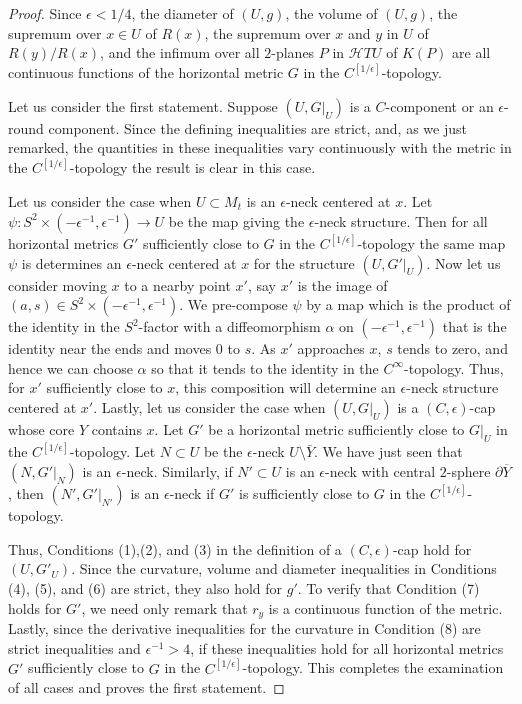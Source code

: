 \begin{proof}
Since $\epsilon<1/4$,  the diameter of $(U,g)$, the volume of
$(U,g)$, the supremum over $x\in U$ of $R(x)$, the supremum over $x$
and $y$ in $U$ of $R(y)/R(x)$, and the infimum over all $2$-planes
$P$ in ${\mathcal H}TU$ of $K(P)$ are all continuous functions of
the horizontal metric $G$ in the $C^{[1/\epsilon]}$-topology.


Let us consider the first statement. Suppose $(U,G|_U)$ is a
$C$-component or an $\epsilon$-round component. Since the defining
inequalities are strict, and, as we just remarked, the quantities in
these inequalities vary continuously with the metric in the
$C^{[1/\epsilon]}$-topology the result is clear in this case.

Let us consider the case when $U\subset M_t$ is an $\epsilon$-neck
centered at $x$. Let $\psi\colon S^2\times
(-\epsilon^{-1},\epsilon^{-1})\to U$ be the map giving the
$\epsilon$-neck structure. Then for all horizontal metrics $G'$
sufficiently close to $G$ in the $C^{[1/\epsilon]}$-topology the
same map $\psi$ is determines an $\epsilon$-neck centered at $x$ for
the structure $(U,G'|_U)$. Now let us consider moving $x$ to a
nearby point $x'$, say $x'$ is the image of $(a,s)\in S^2\times
(-\epsilon^{-1},\epsilon^{-1})$. We pre-compose $\psi$ by a map
which is the product of the identity in the $S^2$-factor with a
diffeomorphism $\alpha$ on $(-\epsilon^{-1},\epsilon^{-1})$ that is
the identity near the ends and moves $0$ to $s$. As $x'$ approaches
$x$, $s$ tends to zero, and hence we can choose $\alpha$ so that it
tends to the identity in the $C^\infty$-topology. Thus, for $x'$
sufficiently close to $x$, this composition will determine an
$\epsilon$-neck structure centered at $x'$. Lastly, let us consider
the case when $(U,G|_U)$ is a $(C,\epsilon)$-cap whose core $Y$
contains $x$. Let $G'$ be a horizontal metric sufficiently close to
$G|_U$ in the $C^{[1/\epsilon]}$-topology. Let $N\subset U$ be the
$\epsilon$-neck $U\setminus \bar Y$. We have just seen that
$(N,G'|_N)$ is an $\epsilon$-neck. Similarly, if $N'\subset U$ is an
$\epsilon$-neck with central $2$-sphere $\partial \overline Y$, then
$(N',G'|_{N'})$ is an $\epsilon$-neck if $G'$ is sufficiently close
to $G$ in the $C^{[1/\epsilon]}$-topology.


Thus, Conditions (1),(2), and (3) in the definition of a
$(C,\epsilon)$-cap hold for $(U,G'_U)$.
 Since the
curvature, volume and diameter inequalities in Conditions (4), (5),
and (6) are strict, they also hold for $g'$. To verify that
Condition (7) holds for $G'$, we need only remark that $r_y$ is a
continuous function of the metric. Lastly, since the derivative
inequalities for the curvature in Condition (8) are strict
inequalities and $\epsilon^{-1}>4$, if these inequalities hold for
all horizontal metrics $G'$ sufficiently close to $G$ in the
$C^{[1/\epsilon]}$-topology. This completes the examination of all
cases and proves the first statement.


\end{proof}
